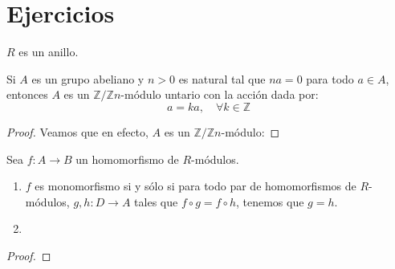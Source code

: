 \documentclass[12pt]{report}
\newcounter{it}
\theoremstyle{largebreak}
\newcommand\cf[3]{\ensuremath{#1:#2\rightarrow#3}}
\begin{document}
    \begin{theor}
        
    \end{theor}

    \begin{theor}
        
    \end{theor}


    \newpage

    \section{Ejercicios}

    \begin{obs}
        $R$ es un anillo.
    \end{obs}

    \begin{excer}
        Si $A$ es un grupo abeliano y $n>0$ es natural tal que $na=0$ para todo $a\in A$, entonces $A$ es un $\mathbb{Z}/\mathbb{Z}n$-módulo untario con la acción dada por:
        \begin{equation*}
            [k]a=ka,\quad\forall k\in\mathbb{Z}
        \end{equation*}
    \end{excer}

    \begin{proof}
        Veamos que en efecto, $A$ es un $\mathbb{Z}/\mathbb{Z}n$-módulo:
    \end{proof}

    \begin{excer}
        Sea $\cf{f}{A}{B}$ un homomorfismo de $R$-módulos.
        \begin{enumerate}[label = \textit{(\alph*)}]
            \item $f$ es monomorfismo si y sólo si para todo par de homomorfismos de $R$-módulos, $\cf{g,h}{D}{A}$ tales que $f\circ g=f\circ h$, tenemos que $g=h$.
            \item 
        \end{enumerate}
    \end{excer}

    \begin{proof}
        
    \end{proof}
\end{document}
